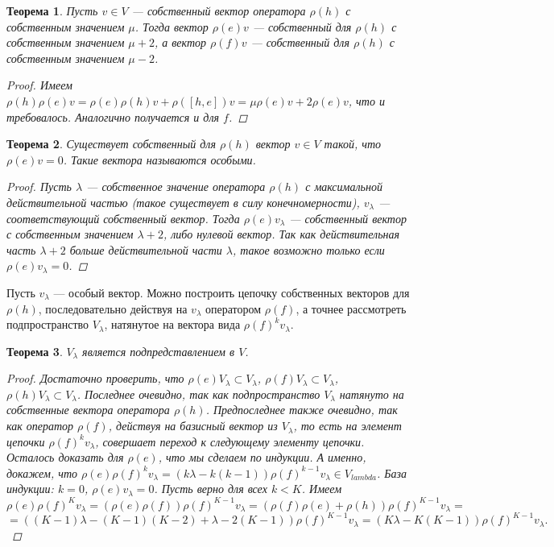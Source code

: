 \documentclass[12pt]{article}
\newtheorem{theorem}{Теорема}[]
\theoremstyle{definition}
\begin{document}
\begin{theorem}
    Пусть $v \in V$ --- собственный вектор оператора $\rho(h)$ с собственным значением $\mu$. Тогда вектор $\rho(e) v$ --- собственный для $\rho(h)$ с собственным значением $\mu + 2$, а вектор $\rho(f) v$ --- собственный для $\rho(h)$ с собственным значением $\mu - 2$.
    \begin{proof}
        Имеем $\rho(h) \rho(e) v = \rho(e) \rho(h) v + \rho([h, e])v = \mu \rho(e) v + 2 \rho(e) v$, что и требовалось. Аналогично получается и для $f$.
    \end{proof}
\end{theorem}

\begin{theorem}
    Существует собственный для $\rho(h)$ вектор $v \in V$ такой, что $\rho(e) v = 0$. Такие вектора называются особыми.
    \begin{proof}
        Пусть $\lambda$ --- собственное значение оператора $\rho(h)$ с максимальной действительной частью (такое существует в силу конечномерности), $v_{\lambda}$ --- соответствующий собственный вектор. Тогда  $\rho(e) v_{\lambda}$ --- собственный вектор с собственным значением $\lambda + 2$, либо нулевой вектор. Так как действительная часть $\lambda + 2$ больше действительной части $\lambda$, такое возможно только если $\rho(e) v_{\lambda} = 0$.
    \end{proof}
\end{theorem}

Пусть $v_{\lambda}$ --- особый вектор. Можно построить цепочку собственных векторов для $\rho(h)$, последовательно действуя на $v_{\lambda}$ оператором $\rho(f)$, а точнее рассмотреть подпространство $V_{\lambda}$, натянутое на вектора вида $\rho(f) ^ k v_{\lambda}$.

\begin{theorem}
    $V_{\lambda}$ является подпредставлением в $V$.
    \begin{proof}
        Достаточно проверить, что $\rho(e) V_{\lambda} \subset V_{\lambda}$, $\rho(f) V_{\lambda} \subset V_{\lambda}$, $\rho(h) V_{\lambda} \subset V_{\lambda}$. Последнее очевидно, так как подпространство $V_{\lambda}$ натянуто на собственные вектора оператора $\rho(h)$. Предпоследнее также очевидно, так как оператор $\rho(f)$, действуя на базисный вектор из $V_{\lambda}$, то есть на элемент цепочки $\rho(f) ^ k v_{\lambda}$, совершает переход к следующему элементу цепочки. Осталось доказать для $\rho(e)$, что мы сделаем по индукции. А именно, докажем, что $\rho(e) \rho(f) ^ k v_{\lambda} = (k \lambda - k(k-1)) \rho(f)^{k-1} v_{\lambda} \in V_{lambda}$. База индукции: $k=0$, $\rho(e) v_{\lambda} = 0$. Пусть верно для всех $k < K$. Имеем
        $$ \rho(e) \rho(f) ^ K v_{\lambda} = (\rho(e) \rho(f)) \rho(f) ^ {K-1} v_{\lambda} = (\rho(f) \rho(e) + \rho(h)) \rho(f) ^ {K-1} v_{\lambda} = $$
        $$ = ((K-1) \lambda - (K-1)(K-2) + \lambda - 2 (K-1)) \rho(f) ^ {K-1} v_{\lambda} = (K \lambda - K (K-1)) \rho(f) ^ {K-1} v_{\lambda}. $$
    \end{proof}
\end{theorem}
\end{document}

